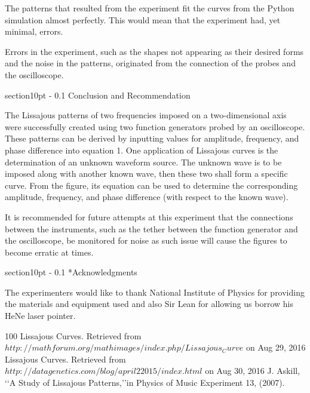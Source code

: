 \documentclass[twoside]{article}
\makeatletter
\renewcommand\section{\@startsection
   {section}{1}{0pt}%
   {-\baselineskip}%
   {0.1\baselineskip}%
   {\normalfont\large\bfseries}}%
\makeatother
\begin{document}
The patterns that resulted from the experiment fit the curves from the Python simulation almost perfectly. This would mean that the experiment had, yet minimal, errors.

Errors in the experiment, such as the shapes not appearing as their desired forms and the noise in the patterns, originated from the connection of the probes and the oscilloscope. 

\section{Conclusion and Recommendation}
\label{sec:submit}

The Lissajous patterns of two frequencies imposed on a two-dimensional axis were successfully created using two function generators probed by an oscilloscope. These patterns can be derived by inputting values for amplitude, frequency, and phase difference into equation 1. One application of Lissajous curves is the determination of an unknown waveform source. The unknown wave is to be imposed along with another known wave, then these two shall form a specific curve. From the figure, its equation can be used to determine the corresponding amplitude, frequency, and phase difference (with respect to the known wave).

It is recommended for future attempts at this experiment that the connections between the instruments, such as the tether between the function generator and the oscilloscope, be monitored for noise as such issue will cause the figures to become erratic at times.

\section*{Acknowledgments}
\label{sec:acknowledgments}

The experimenters would like to thank National Institute of Physics for providing the materials and equipment used and also Sir Lean for allowing us borrow his HeNe laser pointer.

\begin{thebibliography}{100}
Lissajous Curves. Retrieved from $http://mathforum.org/mathimages/index.php/Lissajous_Curve$ on Aug 29, 2016
Lissajous Curves. Retrieved from $http://datagenetics.com/blog/april22015/index.html$ on Aug 30, 2016
J. Askill, \lq\lq A Study of Lissajous Patterns,\rq\rq in Physics of Music Experiment 13, (2007).
\end{thebibliography}
\end{document}
